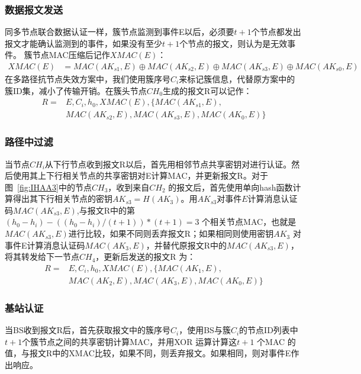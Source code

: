 \subsubsection{数据报文发送}
同多节点联合数据认证一样，簇节点监测到事件E以后，必须要$t+1$个节点都发出报文才能确认监测到的事件，如果没有至少$t+1$个节点的报文，则认为是无效事件。
簇节点MAC压缩后记作$XMAC(E)$：
\begin{equation}\label{XMAC}
\begin{split}
  XMAC(E)
  &=MAC(AK_{s1},E)\oplus MAC(AK_{s2},E)\oplus MAC(AK_{s3},E)\oplus MAC(AK_{s0},E)
\end{split}
\end{equation}
在多路径抗节点失效方案中，我们使用簇序号$C_i$来标记簇信息，代替原方案中的簇ID集，减小了传输开销。在簇头节点$CH_0$生成的报文R可以记作：
\begin{equation}\label{report1}
\begin{split}
  R=
  & E,C_i,h_0,XMAC(E),\{MAC(AK_{s1},E),\\
  & MAC(AK_{s2},E),MAC(AK_{s3},E),MAC(AK_0,E)\}
\end{split}
\end{equation}
\subsubsection{路径中过滤}
当节点$CH_i$从下行节点收到报文R以后，首先用相邻节点共享密钥对进行认证。然后使用其上下行相关节点的共享密钥对E计算MAC，并更新报文R。对于图~\ref{fig:IHAA3}中的节点$CH_3$，收到来自$CH_2$ 的报文后，首先使用单向hash函数计算得出其下行相关节点的密钥$AK_{s3}=H(AK_3)$。用$AK_{s3}$对事件$E$计算消息认证码$MAC(AK_{s3},E)$,与报文R中的第
$(h_0 - h_i)-((h_0 - h_i)/(t+1))\ast (t+1)=3$ 个相关节点MAC，也就是$MAC(AK_{s3},E)$进行比较，如果不同则丢弃报文R；如果相同则使用密钥$AK_3$ 对事件E计算消息认证码$MAC(AK_3,E)$，并替代原报文R中的$MAC(AK_{s3},E)$，将其转发给下一节点$CH_4$，更新后发送的报文R 为：
\begin{equation}\label{report2}
\begin{split}
  R=
  & E,C_i,h_0,XMAC(E),\{MAC(AK_1,E),\\
  & MAC(AK_2,E),MAC(AK_3,E),MAC(AK_0,E)\}
\end{split}
\end{equation}

\subsubsection{基站认证}
当BS收到报文R后，首先获取报文中的簇序号$C_i$，使用BS与簇$C_i$的节点ID列表中$t+1$个簇节点之间的共享密钥计算MAC，并用XOR 运算计算这$t+1$ 个MAC 的值，与报文R中的XMAC比较，如果不同，则丢弃报文。如果相同，则对事件E作出响应。
